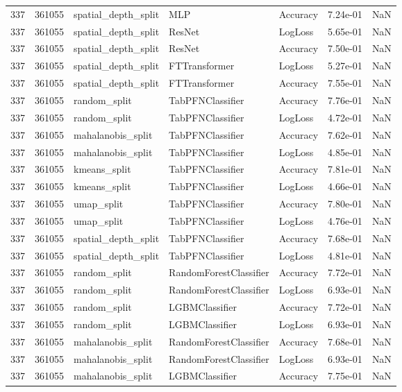 \begin{tabular}{rrlllrr}
337 & 361055 & spatial\_depth\_split & MLP & Accuracy & 7.24e-01 & NaN \\
337 & 361055 & spatial\_depth\_split & ResNet & LogLoss & 5.65e-01 & NaN \\
337 & 361055 & spatial\_depth\_split & ResNet & Accuracy & 7.50e-01 & NaN \\
337 & 361055 & spatial\_depth\_split & FTTransformer & LogLoss & 5.27e-01 & NaN \\
337 & 361055 & spatial\_depth\_split & FTTransformer & Accuracy & 7.55e-01 & NaN \\
337 & 361055 & random\_split & TabPFNClassifier & Accuracy & 7.76e-01 & NaN \\
337 & 361055 & random\_split & TabPFNClassifier & LogLoss & 4.72e-01 & NaN \\
337 & 361055 & mahalanobis\_split & TabPFNClassifier & Accuracy & 7.62e-01 & NaN \\
337 & 361055 & mahalanobis\_split & TabPFNClassifier & LogLoss & 4.85e-01 & NaN \\
337 & 361055 & kmeans\_split & TabPFNClassifier & Accuracy & 7.81e-01 & NaN \\
337 & 361055 & kmeans\_split & TabPFNClassifier & LogLoss & 4.66e-01 & NaN \\
337 & 361055 & umap\_split & TabPFNClassifier & Accuracy & 7.80e-01 & NaN \\
337 & 361055 & umap\_split & TabPFNClassifier & LogLoss & 4.76e-01 & NaN \\
337 & 361055 & spatial\_depth\_split & TabPFNClassifier & Accuracy & 7.68e-01 & NaN \\
337 & 361055 & spatial\_depth\_split & TabPFNClassifier & LogLoss & 4.81e-01 & NaN \\
337 & 361055 & random\_split & RandomForestClassifier & Accuracy & 7.72e-01 & NaN \\
337 & 361055 & random\_split & RandomForestClassifier & LogLoss & 6.93e-01 & NaN \\
337 & 361055 & random\_split & LGBMClassifier & Accuracy & 7.72e-01 & NaN \\
337 & 361055 & random\_split & LGBMClassifier & LogLoss & 6.93e-01 & NaN \\
337 & 361055 & mahalanobis\_split & RandomForestClassifier & Accuracy & 7.68e-01 & NaN \\
337 & 361055 & mahalanobis\_split & RandomForestClassifier & LogLoss & 6.93e-01 & NaN \\
337 & 361055 & mahalanobis\_split & LGBMClassifier & Accuracy & 7.75e-01 & NaN \\

\end{tabular}
